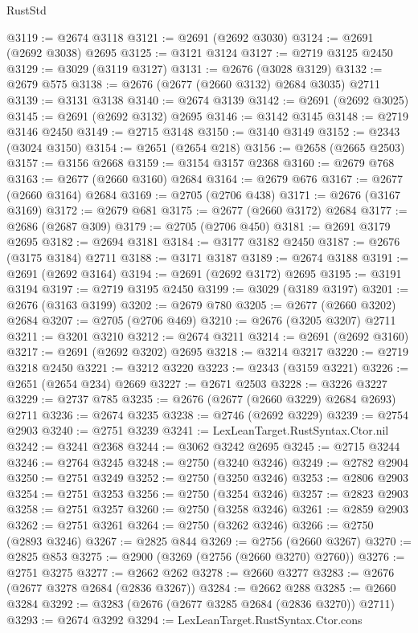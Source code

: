 \begin{lexlean}{RustStd}
\begin{coremodule}
{\begin{coremodule}
{{{{{{{{{{{{{{{{{{{{{{{{{{{{{{{{{{{{{{{{{{{{{{{{{{{{{{{@3119 := @2674 @3118
@3121 := @2691 (@2692 @3030)
@3124 := @2691 (@2692 @3038) @2695
@3125 := @3121 @3124
@3127 := @2719 @3125 @2450
@3129 := @3029 (@3119 @3127)
@3131 := @2676 (@3028 @3129)
@3132 := @2679 @575
@3138 := @2676 (@2677 (@2660 @3132) @2684 @3035) @2711
@3139 := @3131 @3138
@3140 := @2674 @3139
@3142 := @2691 (@2692 @3025)
@3145 := @2691 (@2692 @3132) @2695
@3146 := @3142 @3145
@3148 := @2719 @3146 @2450
@3149 := @2715 @3148
@3150 := @3140 @3149
@3152 := @2343 (@3024 @3150)
@3154 := @2651 (@2654 @218)
@3156 := @2658 (@2665 @2503)
@3157 := @3156 @2668
@3159 := @3154 @3157 @2368
@3160 := @2679 @768
@3163 := @2677 (@2660 @3160) @2684
@3164 := @2679 @676
@3167 := @2677 (@2660 @3164) @2684
@3169 := @2705 (@2706 @438)
@3171 := @2676 (@3167 @3169)
@3172 := @2679 @681
@3175 := @2677 (@2660 @3172) @2684
@3177 := @2686 (@2687 @309)
@3179 := @2705 (@2706 @450)
@3181 := @2691 @3179 @2695
@3182 := @2694 @3181
@3184 := @3177 @3182 @2450
@3187 := @2676 (@3175 @3184) @2711
@3188 := @3171 @3187
@3189 := @2674 @3188
@3191 := @2691 (@2692 @3164)
@3194 := @2691 (@2692 @3172) @2695
@3195 := @3191 @3194
@3197 := @2719 @3195 @2450
@3199 := @3029 (@3189 @3197)
@3201 := @2676 (@3163 @3199)
@3202 := @2679 @780
@3205 := @2677 (@2660 @3202) @2684
@3207 := @2705 (@2706 @469)
@3210 := @2676 (@3205 @3207) @2711
@3211 := @3201 @3210
@3212 := @2674 @3211
@3214 := @2691 (@2692 @3160)
@3217 := @2691 (@2692 @3202) @2695
@3218 := @3214 @3217
@3220 := @2719 @3218 @2450
@3221 := @3212 @3220
@3223 := @2343 (@3159 @3221)
@3226 := @2651 (@2654 @234) @2669
@3227 := @2671 @2503
@3228 := @3226 @3227
@3229 := @2737 @785
@3235 := @2676 (@2677 (@2660 @3229) @2684 @2693) @2711
@3236 := @2674 @3235
@3238 := @2746 (@2692 @3229)
@3239 := @2754 @2903
@3240 := @2751 @3239
@3241 := LexLeanTarget.RustSyntax.Ctor.nil
@3242 := @3241 @2368
@3244 := @3062 @3242 @2695
@3245 := @2715 @3244
@3246 := @2764 @3245
@3248 := @2750 (@3240 @3246)
@3249 := @2782 @2904
@3250 := @2751 @3249
@3252 := @2750 (@3250 @3246)
@3253 := @2806 @2903
@3254 := @2751 @3253
@3256 := @2750 (@3254 @3246)
@3257 := @2823 @2903
@3258 := @2751 @3257
@3260 := @2750 (@3258 @3246)
@3261 := @2859 @2903
@3262 := @2751 @3261
@3264 := @2750 (@3262 @3246)
@3266 := @2750 (@2893 @3246)
@3267 := @2825 @844
@3269 := @2756 (@2660 @3267)
@3270 := @2825 @853
@3275 := @2900 (@3269 (@2756 (@2660 @3270) @2760))
@3276 := @2751 @3275
@3277 := @2662 @262
@3278 := @2660 @3277
@3283 := @2676 (@2677 @3278 @2684 (@2836 @3267))
@3284 := @2662 @288
@3285 := @2660 @3284
@3292 := @3283 (@2676 (@2677 @3285 @2684 (@2836 @3270)) @2711)
@3293 := @2674 @3292
@3294 := LexLeanTarget.RustSyntax.Ctor.cons
}}}}}}}}}}}}}}}}}}}}}}}}}}}}}}}}}}}}}}}}}}}}}}}}}}}}}}}
\end{coremodule}}
\end{coremodule}
\end{lexlean}
